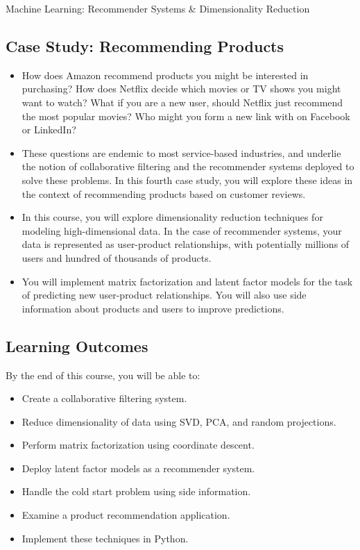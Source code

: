 Machine Learning: Recommender Systems & Dimensionality Reduction

\subsection{Case Study: Recommending Products}
\begin{itemize}
\item How does Amazon recommend products you might be interested in purchasing?  How does Netflix decide which movies or TV shows you might want to watch?  What if you are a new user, should Netflix just recommend the most popular movies?  Who might you form a new link with on Facebook or LinkedIn?  
\item These questions are endemic to most service-based industries, and underlie the notion of collaborative filtering and the recommender systems deployed to solve these problems.  In this fourth case study, you will explore these ideas in the context of recommending products based on customer reviews.  
\item 
In this course, you will explore dimensionality reduction techniques for modeling high-dimensional data.  In the case of recommender systems, your data is represented as user-product relationships, with potentially millions of users and hundred of thousands of products.  \item You will implement matrix factorization and latent factor models for the task of predicting new user-product relationships.  You will also use side information about products and users to improve predictions.
\end{itemize}
\subsection{Learning Outcomes}
By the end of this course, you will be able to:
\begin{itemize}
\item Create a collaborative filtering system.
\item Reduce dimensionality of data using SVD, PCA, and random projections.
\item Perform matrix factorization using coordinate descent.
\item Deploy latent factor models as a recommender system.
\item Handle the cold start problem using side information.
\item Examine a product recommendation application.
\item Implement these techniques in Python.
\end{itemize}

